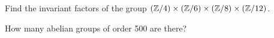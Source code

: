 \begin{exercise}
\label{xca:factors:24,12,4,2}
    Find the invariant factors 
    of the group $(\mathbb{Z}/4)\times(\mathbb{Z}/6)\times(\mathbb{Z}/8)\times(\mathbb{Z}/12)$. 
\end{exercise}

\begin{exercise}
\label{xca:howmany:500}
    How many abelian groups of order 500 are there? 
\end{exercise}


    






